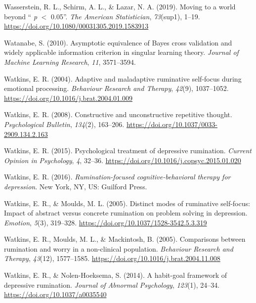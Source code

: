 \documentclass[a4paper,12pt,twoside,onecolumn,openright,final,oldfontcommands]{memoir}
\begin{document}
\leavevmode\hypertarget{ref-wasserstein_moving_2019}{}%
Wasserstein, R. L., Schirm, A. L., \& Lazar, N. A. (2019). Moving to a world beyond `` \emph{p} \(<\) 0.05''. \emph{The American Statistician}, \emph{73}(sup1), 1--19. \url{https://doi.org/10.1080/00031305.2019.1583913}

\leavevmode\hypertarget{ref-watanabe_asymptotic_2010}{}%
Watanabe, S. (2010). Asymptotic equivalence of Bayes cross validation and widely applicable information criterion in singular learning theory. \emph{Journal of Machine Learning Research}, \emph{11}, 3571--3594.

\leavevmode\hypertarget{ref-watkins_adaptive_2004}{}%
Watkins, E. R. (2004). Adaptive and maladaptive ruminative self-focus during emotional processing. \emph{Behaviour Research and Therapy}, \emph{42}(9), 1037--1052. \url{https://doi.org/10.1016/j.brat.2004.01.009}

\leavevmode\hypertarget{ref-Watkins2008}{}%
Watkins, E. R. (2008). Constructive and unconstructive repetitive thought. \emph{Psychological Bulletin}, \emph{134}(2), 163--206. \url{https://doi.org/10.1037/0033-2909.134.2.163}

\leavevmode\hypertarget{ref-watkins_psychological_2015}{}%
Watkins, E. R. (2015). Psychological treatment of depressive rumination. \emph{Current Opinion in Psychology}, \emph{4}, 32--36. \url{https://doi.org/10.1016/j.copsyc.2015.01.020}

\leavevmode\hypertarget{ref-watkins_rumination-focused_2016}{}%
Watkins, E. R. (2016). \emph{Rumination-focused cognitive-behavioral therapy for depression}. New York, NY, US: Guilford Press.

\leavevmode\hypertarget{ref-watkins_distinct_2005}{}%
Watkins, E. R., \& Moulds, M. L. (2005). Distinct modes of ruminative self-focus: Impact of abstract versus concrete rumination on problem solving in depression. \emph{Emotion}, \emph{5}(3), 319--328. \url{https://doi.org/10.1037/1528-3542.5.3.319}

\leavevmode\hypertarget{ref-watkins_comparisons_2005}{}%
Watkins, E. R., Moulds, M. L., \& Mackintosh, B. (2005). Comparisons between rumination and worry in a non-clinical population. \emph{Behaviour Research and Therapy}, \emph{43}(12), 1577--1585. \url{https://doi.org/10.1016/j.brat.2004.11.008}

\leavevmode\hypertarget{ref-watkins_habit-goal_2014}{}%
Watkins, E. R., \& Nolen-Hoeksema, S. (2014). A habit-goal framework of depressive rumination. \emph{Journal of Abnormal Psychology}, \emph{123}(1), 24--34. \url{https://doi.org/10.1037/a0035540}
\end{document}
